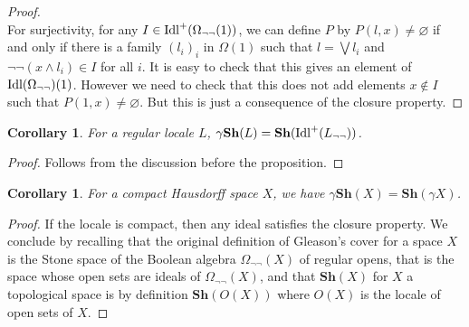 \documentclass{article}
\newtheorem{corollary}[theorem]{Corollary}
\begin{document}
\begin{proof}
    \\
    For surjectivity, for any $I\in \textup{Idl}^+(\Omega_{\neg\neg}(1))$, we can define $P$ by $P(l,x)\ne\varnothing$ if and only if there is a family $(l_i)_i$ in $\Omega(1)$ such that $l=\bigvee l_i$ and $\neg\neg (x\land l_i)\in I$ for all $i$. It is easy to check that this gives an element of $\textup{Idl}(\Omega_{\neg\neg})(1)$. However we need to check that this does not add elements $x\not\in I$ such that $P(1,x)\ne\varnothing$. But this is just a consequence of the closure property. 
\end{proof}

\begin{corollary}
    For a regular locale $L$, $\gamma \mathbf{Sh}(L)=\mathbf{Sh}(\textup{Idl}^+(L_{\neg\neg}))$.
\end{corollary}
\begin{proof}
    Follows from the discussion before the proposition.
\end{proof}

\begin{corollary}\label{gc_top}
    For a compact Hausdorff space $X$, we have $\gamma \mathbf{Sh}(X)=\mathbf{Sh}(\gamma X)$.
\end{corollary}
\begin{proof}
    If the locale is compact, then any ideal satisfies the closure property. We conclude by recalling that the original definition of Gleason's cover for a space $X$ is the Stone space of the Boolean algebra $\Omega_{\neg\neg}(X)$ of regular opens, that is the space whose open sets are ideals of $\Omega_{\neg\neg}(X)$, and that $\mathbf{Sh}(X)$ for $X$ a topological space is by definition $\mathbf{Sh}(O(X))$ where $O(X)$ is the locale of open sets of $X$.
\end{proof}
\end{document}
